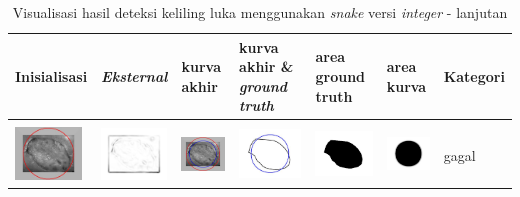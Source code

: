 \begin{table}[H]
	\centering
	\caption{Visualisasi hasil deteksi keliling luka menggunakan \emph{snake} versi \emph{integer} - lanjutan}
	\label{tabel_hasil_5}
	\begin{tabular}{|m{0.7in}|m{0.7in}|m{0.7in}|m{0.7in}|m{0.7in}|m{0.7in}|m{0.7in}|}
		\hline
		\textbf{Inisialisasi} & \textbf{\emph{Eksternal}} & \textbf{kurva akhir} & \textbf{kurva akhir \& \emph{ground truth}}& \textbf{area ground truth} & \textbf{area kurva} & \textbf{Kategori} \\
		\hline
		
		&  &  & & & &  \\
		\includegraphics[width=0.7in]{dataset/dataset_3/luka_kuning/ready/16_integer_init.jpg}&
		\includegraphics[width=0.7in]{dataset/dataset_3/luka_kuning/ready/16_integer_ext.jpg}&
		\includegraphics[width=0.7in]{dataset/dataset_3/luka_kuning/ready/16_integer_result.jpg}&
		\includegraphics[width=0.7in]{dataset/dataset_3/luka_kuning/ready/16_gt_r_integer.jpg}&
		\includegraphics[width=0.7in]{dataset/dataset_3/luka_kuning/ready/16_r.jpg}&
		\includegraphics[width=0.7in]{dataset/dataset_3/luka_kuning/ready/16_integer_r.jpg}&
		gagal\\
		\hline
		

\end{tabular}
\end{table}
